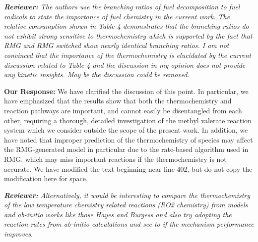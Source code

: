 \documentclass{article}
\newenvironment{reviewer}{\vspace{0.5\baselineskip}\begingroup\itshape\textbf{Reviewer:}}{\endgroup\vspace{0.5\baselineskip}}
\newenvironment{response}{\vspace{0.5\baselineskip}\textbf{Our Response:}}{\vspace{0.5\baselineskip}}
\begin{document}
\begin{reviewer}
    The authors use the branching ratios of fuel decomposition to fuel radicals to state the
    importance of fuel chemistry in the current work. The relative consumption shown in Table 4
    demonstrates that the branching ratios do not exhibit strong sensitive to thermochemistry which
    is supported by the fact that RMG and RMG switched show nearly identical branching ratios. I am
    not convinced that the importance of the thermochemistry is elucidated by the current discussion
    related to Table 4 and the discussion in my opinion does not provide any kinetic insights. May
    be the discussion could be removed.
\end{reviewer}

\begin{response}
    We have clarified the discussion of this point. In particular, we have emphasized that the
    results show that both the thermochemistry and reaction pathways are important, and cannot
    easily be disentangled from each other, requiring a thorough, detailed investigation of the
    methyl valerate reaction system which we consider outside the scope of the present work. In
    addition, we have noted that improper prediction of the thermochemistry of species may affect
    the RMG-generated model in particular due to the rate-based algorithm used in RMG, which may
    miss important reactions if the thermochemistry is not accurate. We have modified the text
    beginning near line 402, but do not copy the modification here for space.
\end{response}

\begin{reviewer}
    Alternatively, it would be interesting to compare the thermochemistry of the low temperature
    chemistry related reactions (RO2 chemistry) from models and ab-initio works like those Hayes and
    Burgess and also try adopting the reaction rates from ab-initio calculations and see to if the
    mechanism performance improves.
\end{reviewer}
\end{document}
